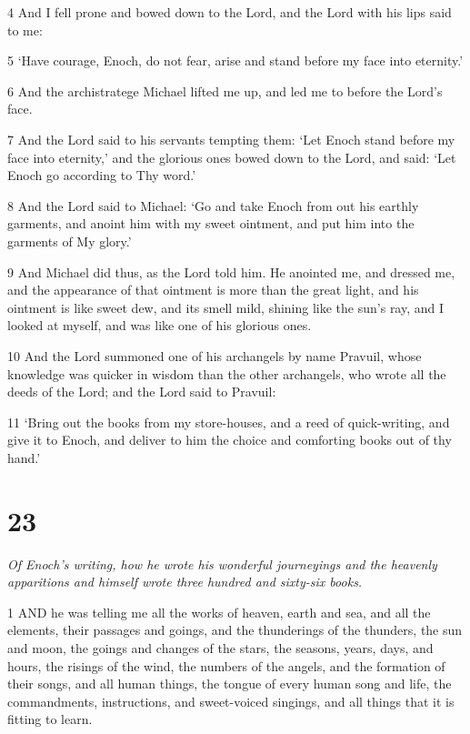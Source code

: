 \par 4 And I fell prone and bowed down to the Lord, and the Lord with his lips said to me:

\par 5 ‘Have courage, Enoch, do not fear, arise and stand before my face into eternity.’

\par 6 And the archistratege Michael lifted me up, and led me to before the Lord's face.

\par 7 And the Lord said to his servants tempting them: ‘Let Enoch stand before my face into eternity,’ and the glorious ones bowed down to the Lord, and said: ‘Let Enoch go according to Thy word.’

\par 8 And the Lord said to Michael: ‘Go and take Enoch from out his earthly garments, and anoint him with my sweet ointment, and put him into the garments of My glory.’

\par 9 And Michael did thus, as the Lord told him. He anointed me, and dressed me, and the appearance of that ointment is more than the great light, and his ointment is like sweet dew, and its smell mild, shining like the sun's ray, and I looked at myself, and was like one of his glorious ones.

\par 10 And the Lord summoned one of his archangels by name Pravuil, whose knowledge was quicker in wisdom than the other archangels, who wrote all the deeds of the Lord; and the Lord said to Pravuil:

\par 11 ‘Bring out the books from my store-houses, and a reed of quick-writing, and give it to Enoch, and deliver to him the choice and comforting books out of thy hand.’



\chapter{23}

\par \textit{Of Enoch's writing, how he wrote his wonderful journeyings and the heavenly apparitions and himself wrote three hundred and sixty-six books.}

\par 1 AND he was telling me all the works of heaven, earth and sea, and all the elements, their passages and goings, and the thunderings of the thunders, the sun and moon, the goings and changes of the stars, the seasons, years, days, and hours, the risings of the wind, the numbers of the angels, and the formation of their songs, and all human things, the tongue of every human song and life, the commandments, instructions, and sweet-voiced singings, and all things that it is fitting to learn.

